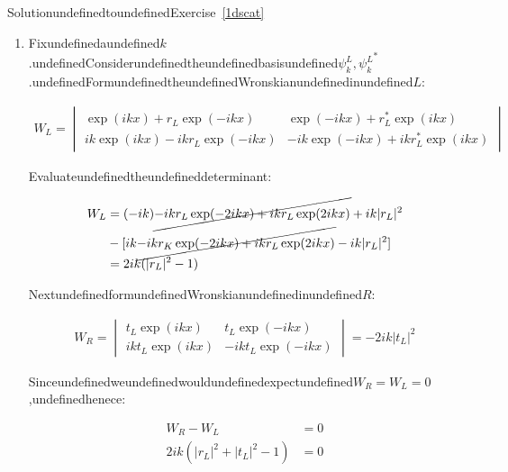 \begin{mystsolution}{SolutionundefinedtoundefinedExercise~\ref{1dscat}}\begin{enumerate}
\item Fixundefinedaundefined$k$.undefinedConsiderundefinedtheundefinedbasisundefined$\psi_k^L, {\psi_k^L}^*$.undefinedFormundefinedtheundefinedWronskianundefinedinundefined$L$:

\begin{equation}
\begin{aligned}
W_L=\begin{vmatrix}
\exp(ikx)+r_L\exp(-ikx) &   \exp(-ikx)+r_L^*\exp(ikx) \\
ik\exp(ikx)-ikr_L\exp(-ikx) & -ik\exp(-ikx)+ikr_L^*\exp(ikx)
\end{vmatrix}
\end{aligned}
\end{equation}


Evaluateundefinedtheundefineddeterminant:

\begin{equation}
\begin{aligned}
W_L &= (-ik)\cancel{-ikr_L\exp(-2ikx) + ikr_L\exp(2ikx)}+ik|r_L|^2  \\
&-[ik\cancel{-ikr_K\exp(-2ikx)+ikr_L\exp(2ikx)}-ik|r_L|^2]  \\
&= 2ik(|r_L|^2-1)
\end{aligned}
\end{equation}


NextundefinedformundefinedWronskianundefinedinundefined$R$:

\begin{equation}
\begin{aligned}
W_R = \begin{vmatrix}
t_L\exp(ikx) & t_L\exp(-ikx) \\
ikt_L\exp(ikx) & -ikt_L\exp(-ikx) 
\end{vmatrix} = -2ik|t_L|^2
\end{aligned}
\end{equation}


Sinceundefinedweundefinedwouldundefinedexpectundefined$W_R=W_L=0$,undefinedhenece:

\begin{equation}
\begin{aligned}
W_R-W_L&=0 \\
2ik(|r_L|^2+|t_L|^2-1) &=0
\end{aligned}
\end{equation}



\end{enumerate}
\end{mystsolution}
